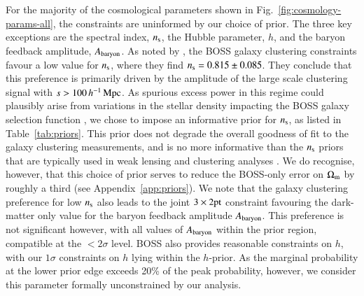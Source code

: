 For the majority of the cosmological parameters shown in Fig.~\ref{fig:cosmology-params-all}, the constraints are uninformed by our choice of prior.  The three key exceptions are the spectral index, $n_{\rm s}$, the Hubble parameter, $h$, and the baryon feedback amplitude, $A_{\rm baryon}$.  As noted by \citet{troester/etal:2020}, the BOSS galaxy clustering constraints favour a low value for $n_{\rm s}$, where they find $n_{\rm s} = 0.815 \pm 0.085$.  They conclude that this preference is primarily driven by the amplitude of the large scale clustering signal with $s > 100 \, h^{-1}\, {\rm Mpc}$.  As spurious excess power in this regime could plausibly arise from variations in the stellar density impacting the BOSS galaxy selection function \citep{ross/etal:2017}, we chose to impose an informative prior for $n_{\rm s}$, as listed in Table~\ref{tab:priors}.   This prior does not degrade the overall goodness of fit to the galaxy clustering measurements, and is no more informative than the $n_{\rm s}$ priors that are typically used in weak lensing and clustering analyses \citep[see for example][]{sanchez/etal:2017,abbott/etal:2018}.  We do recognise, however, that this choice of prior serves to reduce the BOSS-only error on $\Omega_{\rm m}$ by roughly a third (see Appendix~\ref{app:priors}).   We note that the galaxy clustering preference for low $n_{\rm s}$ also leads to the joint $3\times2{\rm pt}$ constraint favouring the dark-matter only value for the baryon feedback amplitude $A_{\rm baryon}$.   This preference is not significant however, with all values of $A_{\rm baryon}$ within the prior region, compatible at the $<2 \sigma$ level.   BOSS also provides reasonable constraints on $h$, with our $1\sigma$ constraints on $h$ lying within the $h$-prior.   As the marginal probability at the lower prior edge exceeds 20\% of the peak probability, however, we consider this parameter formally unconstrained by our analysis.

